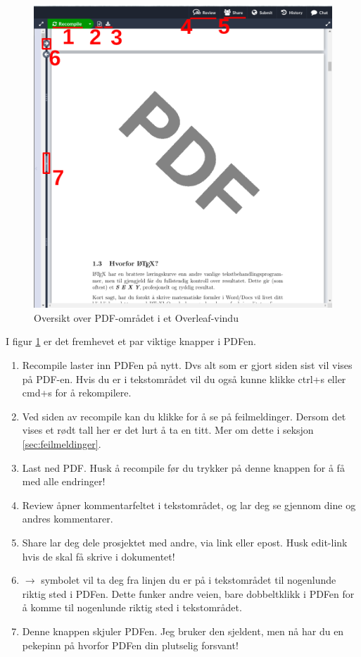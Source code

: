         \begin{figure}[h!]
            \centering
            \includegraphics[width=\textwidth]{bilder/Latex-guide-pdf.png}
            \caption{Oversikt over PDF-området i et Overleaf-vindu}
            \label{fig:oversikt-overleaf-pdf}
        \end{figure}
    
        I figur \ref{fig:oversikt-overleaf-pdf} er det fremhevet et par viktige knapper i PDFen.
        \begin{enumerate}
            \item Recompile laster inn PDFen på nytt. Dvs alt som er gjort siden sist vil vises på PDF-en. Hvis du er i tekstområdet vil du også kunne klikke ctrl+s eller cmd+s for å rekompilere.
            \item Ved siden av recompile kan du klikke for å se på feilmeldinger. Dersom det vises et rødt tall her er det lurt å ta en titt. Mer om dette i seksjon \ref{sec:feilmeldinger}.
            \item Last ned PDF. Husk å recompile før du trykker på denne knappen for å få med alle endringer!
            \item Review åpner kommentarfeltet i tekstområdet, og lar deg se gjennom dine og andres kommentarer.
            \item Share lar deg dele prosjektet med andre, via link eller epost. Husk edit-link hvis de skal få skrive i dokumentet!
            \item $\rightarrow$ symbolet vil ta deg fra linjen du er på i tekstområdet til nogenlunde riktig sted i PDFen. Dette funker andre veien, bare dobbeltklikk i PDFen for å komme til nogenlunde riktig sted i tekstområdet.
            \item Denne knappen skjuler PDFen. Jeg bruker den sjeldent, men nå har du en pekepinn på hvorfor PDFen din plutselig forsvant!
        \end{enumerate}
        
